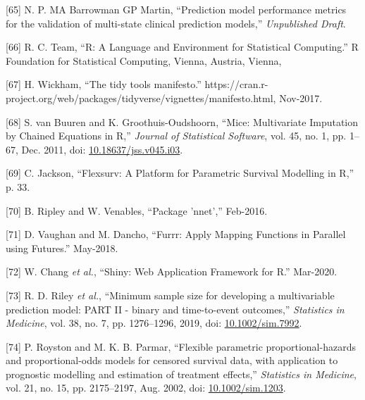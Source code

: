 \documentclass[
]{article}
\newenvironment{cslreferences}%
  {}%
  {\par}
\begin{document}
\begin{cslreferences}
\leavevmode\hypertarget{ref-chap-performance-metrics}{}%
{[}65{]} N. P. MA Barrowman GP Martin, ``Prediction model performance metrics for the validation of multi-state clinical prediction models,'' \emph{Unpublished Draft}.

\leavevmode\hypertarget{ref-r_core_team_r_nodate}{}%
{[}66{]} R. C. Team, ``R: A Language and Environment for Statistical Computing.'' R Foundation for Statistical Computing, Vienna, Austria, Vienna,

\leavevmode\hypertarget{ref-wickham_tidy_2017}{}%
{[}67{]} H. Wickham, ``The tidy tools manifesto.'' https://cran.r-project.org/web/packages/tidyverse/vignettes/manifesto.html, Nov-2017.

\leavevmode\hypertarget{ref-buuren_mice_2011-1}{}%
{[}68{]} S. van Buuren and K. Groothuis-Oudshoorn, ``Mice: Multivariate Imputation by Chained Equations in R,'' \emph{Journal of Statistical Software}, vol. 45, no. 1, pp. 1--67, Dec. 2011, doi: \href{https://doi.org/10.18637/jss.v045.i03}{10.18637/jss.v045.i03}.

\leavevmode\hypertarget{ref-jackson_flexsurv_nodate}{}%
{[}69{]} C. Jackson, ``Flexsurv: A Platform for Parametric Survival Modelling in R,'' p. 33.

\leavevmode\hypertarget{ref-ripley_package_2016}{}%
{[}70{]} B. Ripley and W. Venables, ``Package 'nnet','' Feb-2016.

\leavevmode\hypertarget{ref-vaughan_furrr_2018}{}%
{[}71{]} D. Vaughan and M. Dancho, ``Furrr: Apply Mapping Functions in Parallel using Futures.'' May-2018.

\leavevmode\hypertarget{ref-chang_shiny_2020}{}%
{[}72{]} W. Chang \emph{et al.}, ``Shiny: Web Application Framework for R.'' Mar-2020.

\leavevmode\hypertarget{ref-riley_minimum_2019}{}%
{[}73{]} R. D. Riley \emph{et al.}, ``Minimum sample size for developing a multivariable prediction model: PART II - binary and time-to-event outcomes,'' \emph{Statistics in Medicine}, vol. 38, no. 7, pp. 1276--1296, 2019, doi: \href{https://doi.org/10.1002/sim.7992}{10.1002/sim.7992}.

\leavevmode\hypertarget{ref-royston_flexible_2002}{}%
{[}74{]} P. Royston and M. K. B. Parmar, ``Flexible parametric proportional-hazards and proportional-odds models for censored survival data, with application to prognostic modelling and estimation of treatment effects,'' \emph{Statistics in Medicine}, vol. 21, no. 15, pp. 2175--2197, Aug. 2002, doi: \href{https://doi.org/10.1002/sim.1203}{10.1002/sim.1203}.


\end{cslreferences}
\end{document}
